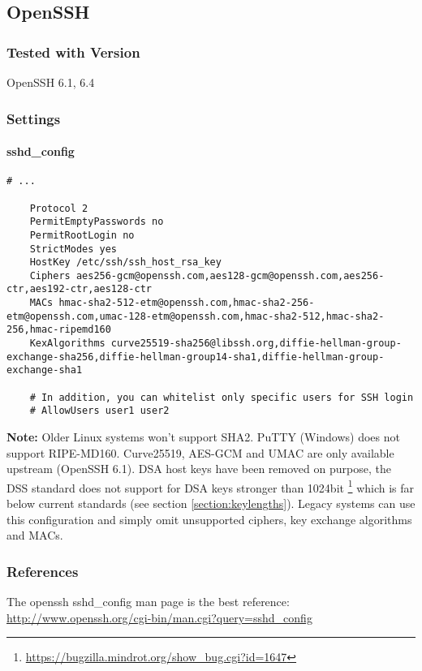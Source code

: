 \subsection{OpenSSH}
\subsubsection{Tested with Version} OpenSSH 6.1, 6.4
\subsubsection{Settings}
\paragraph*{sshd\_config}
\begin{lstlisting}[breaklines]
	# ...

	Protocol 2
	PermitEmptyPasswords no
	PermitRootLogin no
	StrictModes yes
	HostKey /etc/ssh/ssh_host_rsa_key
	Ciphers aes256-gcm@openssh.com,aes128-gcm@openssh.com,aes256-ctr,aes192-ctr,aes128-ctr
	MACs hmac-sha2-512-etm@openssh.com,hmac-sha2-256-etm@openssh.com,umac-128-etm@openssh.com,hmac-sha2-512,hmac-sha2-256,hmac-ripemd160
	KexAlgorithms curve25519-sha256@libssh.org,diffie-hellman-group-exchange-sha256,diffie-hellman-group14-sha1,diffie-hellman-group-exchange-sha1

	# In addition, you can whitelist only specific users for SSH login
	# AllowUsers user1 user2
\end{lstlisting}

\textbf{Note:} Older Linux systems won't support SHA2. PuTTY (Windows) does not support
RIPE-MD160. Curve25519, AES-GCM and UMAC are only available upstream (OpenSSH
6.1). DSA host keys have been removed on purpose, the DSS standard does not
support for DSA keys stronger than 1024bit
\footnote{\url{https://bugzilla.mindrot.org/show_bug.cgi?id=1647}} which is far
below current standards (see section \ref{section:keylengths}). Legacy systems
can use this configuration and simply omit unsupported ciphers, key exchange
algorithms and MACs.  
\subsubsection{References}
The openssh sshd\_config  man page is the best reference: \url{http://www.openssh.org/cgi-bin/man.cgi?query=sshd_config}
